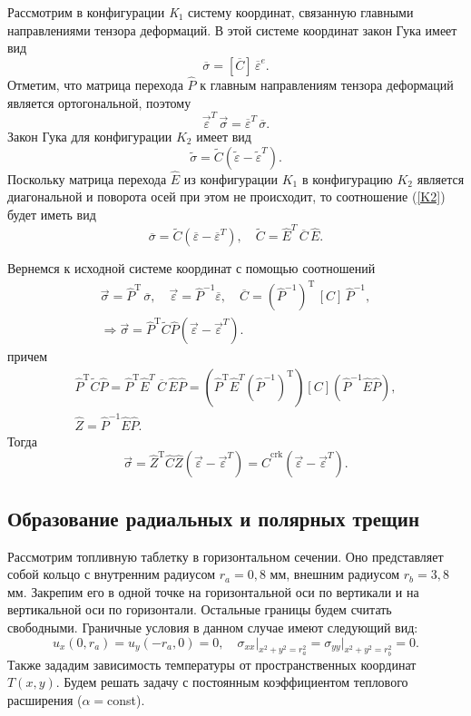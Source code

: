 \documentclass[12pt, a4paper]{article}
\begin{document}
Рассмотрим в конфигурации \textit{K$_1$} систему координат, связанную главными направлениями тензора деформаций. В этой системе координат закон Гука имеет вид
\[
\overline{\sigma}=[\overline{C}]\,\overline{\varepsilon}^e.
\]
Отметим, что матрица перехода $\hat{P}$ к главным направлениям тензора деформаций является ортогональной, поэтому
\[
\vec{\varepsilon}^T\,\vec \sigma=\overline{\varepsilon}^T\,\overline{\sigma}.
\]
Закон Гука для конфигурации $K_2$ имеет вид
\[
\tilde{\sigma}=\tilde{C}\left(\tilde{\varepsilon}-\tilde{\varepsilon}^T\right).
\label{K2}
\] 
Поскольку матрица перехода $\hat{E}$ из конфигурации $K_1$ в конфигурацию $K_2$ является диагональной и поворота осей при этом не происходит, то соотношение (\ref{K2}) будет иметь вид 
\[
\overline{\sigma}=\tilde{C}\left(\overline{\varepsilon}-\overline{\varepsilon}^T\right),\quad \tilde{C}=\hat E^T\,\overline{C}\,\hat E.
\] 

Вернемся к исходной системе координат с помощью соотношений
\[
\begin{gathered}
\vec\sigma = \hat P^{\mathrm T}\,\overline{\sigma},\quad \vec \varepsilon=\hat P^{-1} \overline{\varepsilon},\quad \overline{C}=\left(\hat P^{-1}\right)^{\mathrm T}\,[C]\,\hat P^{-1},\\
\Rightarrow \vec \sigma =  \hat P^{\mathrm T}\tilde C \hat P\left(\vec \varepsilon-\vec \varepsilon^T\right).
\end{gathered}
\]
причем
\[
\begin{gathered}
\hat P^{\mathrm T}\tilde C \hat P = \hat P^{\mathrm T}\hat E^T\,\overline{C}\,\hat E \hat P=\left(\hat P^{\mathrm T}\hat E^T(\hat P^{-1})^{\mathrm T}\right)[C]\left(\hat P^{-1}\hat E \hat P\right),\\
\hat Z=\hat P^{-1}\hat E \hat P.
\end{gathered}
\]
Тогда 
\[
\vec \sigma =  \hat Z^{\mathrm T} \hat C \hat Z\left(\vec \varepsilon-\vec \varepsilon^T\right) = \hat C^{\mathrm{crk}}\left(\vec \varepsilon-\vec \varepsilon^T\right).
\]

	\subsection{Образование радиальных и полярных трещин}
	Рассмотрим топливную таблетку в горизонтальном сечении. Оно представляет собой кольцо с внутренним радиусом $r_a=0,8$ мм, внешним радиусом $r_b=3,8$ мм. Закрепим его в одной точке на горизонтальной оси по вертикали и на вертикальной оси по горизонтали. Остальные границы будем считать свободными. Граничные условия в данном случае имеют следующий вид:
	\[
	u_x(0,r_a) = u_y(-r_a,0)=0, \quad \sigma_{xx}\left.\right|_{x^2+y^2=r_a^2}=\sigma_{yy}\left.\right|_{x^2+y^2=r_b^2}=0.
	\]
	 Также зададим зависимость температуры от пространственных координат $T(x,y)$. Будем решать задачу с постоянным коэффициентом теплового расширения ($\alpha=$const).
	 
\end{document}
